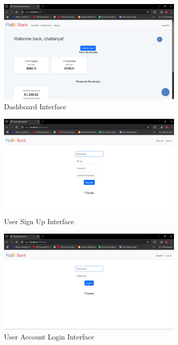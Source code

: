 \begin{figure}[h]
  \centering
  \includegraphics[width=0.8\textwidth]{flask_assets/dashboard.jpg}
  \caption{Dashboard Interface}
\end{figure}

\begin{figure}[h]
  \centering
  \includegraphics[width=0.8\textwidth]{flask_assets/register.jpg}
  \caption{User Sign Up Interface}
\end{figure}

\begin{figure}[h]
  \centering
  \includegraphics[width=0.8\textwidth]{flask_assets/login.jpg}
  \caption{User Account Login Interface}
\end{figure}

